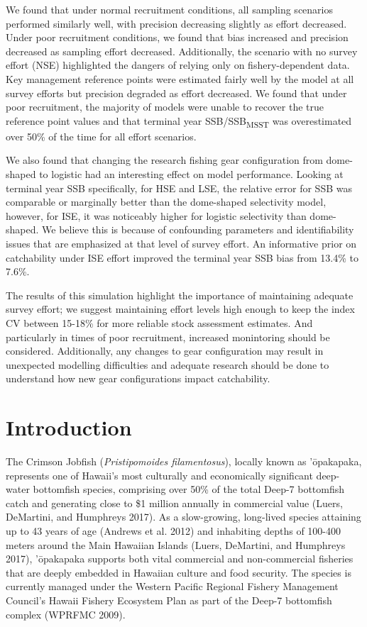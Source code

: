 \documentclass[
  letterpaper,
  12pt,
  letterpaper]{report}
\begin{document}
We found that under normal recruitment conditions, all sampling
scenarios performed similarly well, with precision decreasing slightly
as effort decreased. Under poor recruitment conditions, we found that
bias increased and precision decreased as sampling effort decreased.
Additionally, the scenario with no survey effort (NSE) highlighted the
dangers of relying only on fishery-dependent data. Key management
reference points were estimated fairly well by the model at all survey
efforts but precision degraded as effort decreased. We found that under
poor recruitment, the majority of models were unable to recover the true
reference point values and that terminal year
SSB/SSB\textsubscript{MSST} was overestimated over 50\% of the time for
all effort scenarios.

We also found that changing the research fishing gear configuration from
dome-shaped to logistic had an interesting effect on model performance.
Looking at terminal year SSB specifically, for HSE and LSE, the relative
error for SSB was comparable or marginally better than the dome-shaped
selectivity model, however, for ISE, it was noticeably higher for
logistic selectivity than dome-shaped. We believe this is because of
confounding parameters and identifiability issues that are emphasized at
that level of survey effort. An informative prior on catchability under
ISE effort improved the terminal year SSB bias from 13.4\% to 7.6\%.

The results of this simulation highlight the importance of maintaining
adequate survey effort; we suggest maintaining effort levels high enough
to keep the index CV between 15-18\% for more reliable stock assessment
estimates. And particularly in times of poor recruitment, increased
monintoring should be considered. Additionally, any changes to gear
configuration may result in unexpected modelling difficulties and
adequate research should be done to understand how new gear
configurations impact catchability.


\chapter{Introduction}\label{introduction}


The Crimson Jobfish (\emph{Pristipomoides filamentosus}), locally known
as 'ōpakapaka, represents one of Hawaii's most culturally and
economically significant deep-water bottomfish species, comprising over
50\% of the total Deep-7 bottomfish catch and generating close to \$1
million annually in commercial value (Luers, DeMartini, and Humphreys
2017). As a slow-growing, long-lived species attaining up to 43 years of
age (Andrews et al. 2012) and inhabiting depths of 100-400 meters around
the Main Hawaiian Islands (Luers, DeMartini, and Humphreys 2017),
'ōpakapaka supports both vital commercial and non-commercial fisheries
that are deeply embedded in Hawaiian culture and food security. The
species is currently managed under the Western Pacific Regional Fishery
Management Council's Hawaii Fishery Ecosystem Plan as part of the Deep-7
bottomfish complex (WPRFMC 2009).
\end{document}
